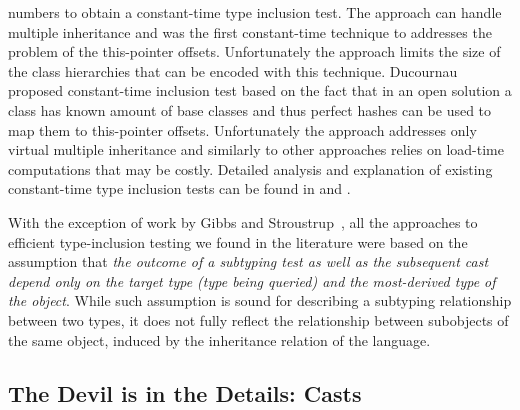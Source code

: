 numbers to obtain a constant-time type inclusion test. The approach can handle 
multiple inheritance and was the first constant-time technique to addresses the 
problem of the this-pointer offsets. Unfortunately the approach limits the size 
of the class hierarchies that can be encoded with this technique. 
Ducournau proposed constant-time inclusion test based on the fact that in an 
open solution a class has known amount of base classes and thus perfect hashes 
can be used to map them to this-pointer offsets\cite{Ducournau08}. Unfortunately 
the approach addresses only virtual multiple inheritance and similarly to other 
approaches relies on load-time computations that may be costly.
Detailed analysis and explanation of existing constant-time type inclusion tests 
can be found in \cite{Vitek97} and \cite{PQEncoding}.

With the exception of work by Gibbs and Stroustrup~\cite{FastDynCast}, all the 
approaches to efficient type-inclusion testing we found in the literature were 
based on the assumption that \emph{the outcome of a subtyping test as well as 
the subsequent cast depend only on the target type (type being queried) and the 
most-derived type of the object}. While such assumption is sound for describing 
a subtyping relationship between two types, it does not fully reflect the 
relationship between subobjects of the same object, induced by the inheritance 
relation of the language. %

\subsection{The Devil is in the Details: Casts}
\label{sec:casts}

%


